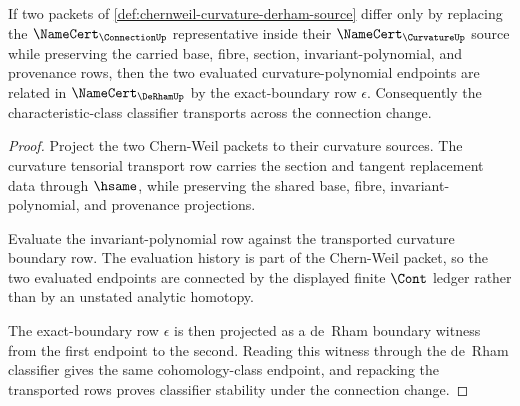 \begin{theorem}
\label{thm:chernweil-connection-change-cocycle-obligation}
If two packets of \autoref{def:chernweil-curvature-derham-source} differ only by replacing the $\NameCert_{\ConnectionUp}$ representative inside their $\NameCert_{\CurvatureUp}$ source while preserving the carried base, fibre, section, invariant-polynomial, and provenance rows, then the two evaluated curvature-polynomial endpoints are related in $\NameCert_{\DeRhamUp}$ by the exact-boundary row $\epsilon$. Consequently the characteristic-class classifier transports across the connection change.
\end{theorem}
\begin{proof}
Project the two Chern-Weil packets to their curvature sources. The curvature tensorial transport row carries the section and tangent replacement data through $\hsame$, while preserving the shared base, fibre, invariant-polynomial, and provenance projections.

Evaluate the invariant-polynomial row against the transported curvature boundary row. The evaluation history is part of the Chern-Weil packet, so the two evaluated endpoints are connected by the displayed finite $\Cont$ ledger rather than by an unstated analytic homotopy.

The exact-boundary row $\epsilon$ is then projected as a de~Rham boundary witness from the first endpoint to the second. Reading this witness through the de~Rham classifier gives the same cohomology-class endpoint, and repacking the transported rows proves classifier stability under the connection change.
\end{proof}

